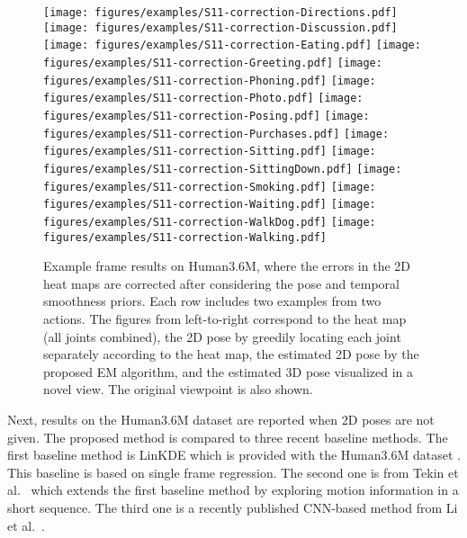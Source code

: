 \documentclass[10pt,twocolumn,letterpaper]{article}
\begin{document}
{\begin{figure*}
  \centering
\texttt{[image: figures/examples/S11-correction-Directions.pdf]}\hspace{3em}
  \texttt{[image: figures/examples/S11-correction-Discussion.pdf]}
  \texttt{[image: figures/examples/S11-correction-Eating.pdf]}\hspace{3em}
  \texttt{[image: figures/examples/S11-correction-Greeting.pdf]}
  \texttt{[image: figures/examples/S11-correction-Phoning.pdf]}\hspace{3em}
  \texttt{[image: figures/examples/S11-correction-Photo.pdf]}
  \texttt{[image: figures/examples/S11-correction-Posing.pdf]}\hspace{3em}
  \texttt{[image: figures/examples/S11-correction-Purchases.pdf]}
  \texttt{[image: figures/examples/S11-correction-Sitting.pdf]}\hspace{3em}
  \texttt{[image: figures/examples/S11-correction-SittingDown.pdf]}
  \texttt{[image: figures/examples/S11-correction-Smoking.pdf]}\hspace{3em}
  \texttt{[image: figures/examples/S11-correction-Waiting.pdf]}
  \texttt{[image: figures/examples/S11-correction-WalkDog.pdf]}\hspace{3em}
  \texttt{[image: figures/examples/S11-correction-Walking.pdf]}
  \caption{Example frame results on Human3.6M, where the errors in the 2D heat maps are corrected after considering the pose and temporal smoothness priors. Each row includes two examples from two actions. The figures from left-to-right correspond to the heat map (all joints combined), the 2D pose by greedily locating each joint separately according to the heat map, the estimated 2D pose by the proposed EM algorithm, and the estimated 3D pose visualized in a novel view. The original viewpoint is also shown. }\label{fig:h36m}
\end{figure*}

Next, results on the Human3.6M dataset are reported when 2D poses are not given. The proposed method is compared to three recent baseline methods. The first baseline method is LinKDE which is provided with the Human3.6M dataset \cite{ionescu2014human}.  This baseline is based on single frame regression. The second one is from Tekin et al.\ \cite{tekin2015predicting} which extends the first baseline method by exploring motion information in a short sequence. The third one is a recently published CNN-based method from Li et al.\ \cite{li2015maximum}.

}
\end{document}
